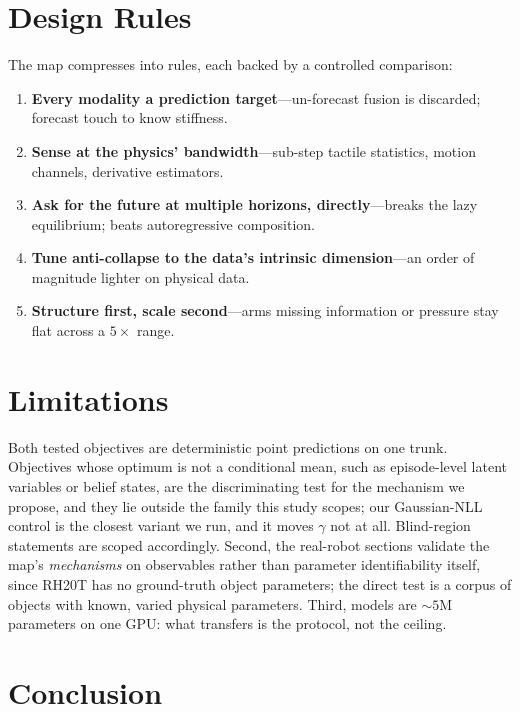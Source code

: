 \documentclass{article} %
\begin{document}
\section{Design Rules}
\label{sec:discussion}

The map compresses into rules, each backed by a controlled comparison:

\begin{enumerate}[itemsep=1pt,topsep=3pt,parsep=0pt]
\item \textbf{Every modality a prediction target}---un-forecast fusion is
discarded; forecast touch to know stiffness.
\item \textbf{Sense at the physics' bandwidth}---sub-step tactile
statistics, motion channels, derivative estimators.
\item \textbf{Ask for the future at multiple horizons, directly}---breaks
the lazy equilibrium; beats autoregressive composition.
\item \textbf{Tune anti-collapse to the data's intrinsic dimension}---an
order of magnitude lighter on physical data.
\item \textbf{Structure first, scale second}---arms missing information or
pressure stay flat across a $5\times$ range.
\end{enumerate}

\section{Limitations}
\label{sec:limitations}

Both tested objectives are deterministic point predictions on one trunk.
Objectives whose optimum is not a conditional mean, such as
episode-level latent variables or belief states, are the discriminating
test for the mechanism we propose, and they lie outside the family this
study scopes; our Gaussian-NLL control is the closest variant we run,
and it moves $\gamma$ not at all. Blind-region statements are scoped
accordingly. Second, the real-robot sections validate the map's
\emph{mechanisms} on observables rather than parameter identifiability
itself, since RH20T has no ground-truth object parameters; the direct
test is a corpus of objects with known, varied physical parameters.
Third, models are ${\sim}5$M parameters on one GPU: what transfers is
the protocol, not the ceiling.

\section{Conclusion}
\label{sec:conclusion}
\end{document}
